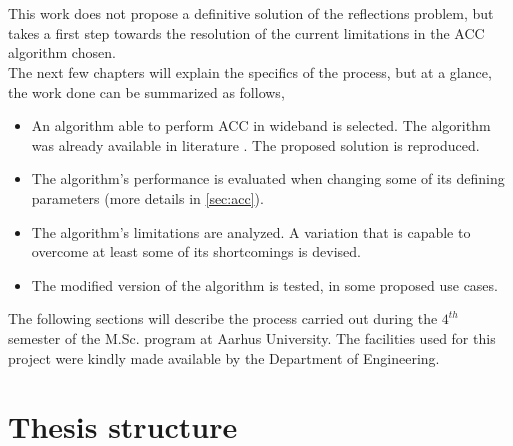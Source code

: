 \\
\\
This work does not propose a definitive solution of the reflections problem, but takes a first step towards the resolution of the current limitations in the ACC algorithm chosen.
\\
The next few chapters will explain the specifics of the process, but at a glance, the work done can be summarized as follows,
\begin{itemize}
\item An algorithm able to perform ACC in wideband is selected. The algorithm was already available in literature \parencite{cai_time-domain_2014}. The proposed solution is reproduced.
\item The algorithm's performance is evaluated when changing some of its defining parameters (more details in \ref{sec:acc}).
\item The algorithm's limitations are analyzed. A variation that is capable to overcome at least some of its shortcomings is devised.
\item The modified version of the algorithm is tested, in some proposed use cases.
\end{itemize}

The following sections will describe the process carried out during the $4^{th}$ semester of the M.Sc. program at Aarhus University. The facilities used for this project were kindly made available by the Department of Engineering.

\section{Thesis structure}


